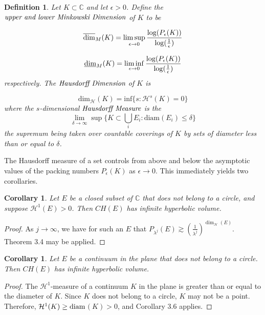 \documentclass[11pt]{article}
\newtheorem{cor}[tm]{Corollary}
\newtheorem{defi}[tm]{Definition}
\newcommand\comp{{\mathbb{C}}}
\begin{document}
    \begin{defi}
       Let $K \subset \comp$ and let $\epsilon > 0$. Define the $\emph{upper and lower Minkowski Dimension}$ of $K$ to be 

    $$\overline{\rm{dim}}_M(K) = \limsup_{\epsilon \rightarrow 0} \frac{\log(P_\epsilon(K))}{\log(\frac{1}{\epsilon})}$$

    $$\underline{\rm{dim}}_M(K) = \liminf_{\epsilon \rightarrow 0} \frac{\log(P_\epsilon(K))}{\log(\frac{1}{\epsilon})}$$ respectively.  The $\emph{Hausdorff Dimension}$ of $K$ is 

    $$\mathrm{dim}_\mathcal{H} (K) = \mathrm{inf}\{s : \mathcal{H}^s(K) = 0\}$$ where the $s$-dimensional $\emph{Hausdorff Measure}$ is the $$\lim_{\delta \rightarrow \infty} \sup \{K \subset \bigcup_i E_i : \mathrm{diam}(E_i) \leq \delta \}$$ the supremum being taken over countable coverings of $K$ by sets of diameter less than or equal to $\delta$.  
       
    \end{defi}

    The Hausdorff measure of a set controls from above and below the asymptotic values of the packing numbers $P_\epsilon(K)$ as $\epsilon \rightarrow 0$. This immediately yields two corollaries. 

 \begin{cor}
     Let $E$  be a closed subset of $\comp$ that does not belong to a circle, and suppose $\mathcal{H}^1(E) > 0$. Then $CH(E)$ has infinite hyperbolic volume. 
 \end{cor}

 \begin{proof} As $j\rightarrow \infty$, we have for such an $E$ that $P_{\lambda^j}(E) \gtrsim (\frac{1}{\lambda^j})^{\dim_{\mathcal{H}}(E)}$. Theorem 3.4 may be applied.
 \end{proof}

 \begin{cor}
     Let $E$ be a continuum in the plane that does not belong to a circle. Then $CH(E)$ has infinite hyperbolic volume.
 \end{cor}

\begin{proof} The $\mathcal{H}^1$-measure of a continuum $K$ in the plane is greater than or equal to the diameter of $K$. Since $K$ does not belong to a circle, $K$ may not be a point. Therefore, $\mathcal{H}^1(K) \geq \rm{diam}$$(K) > 0$, and Corollary 3.6 applies. 
\end{proof}
\end{document}
